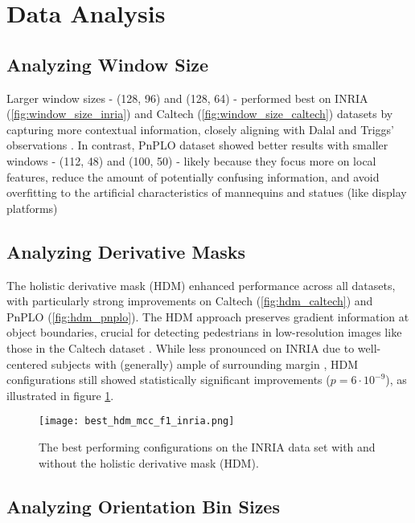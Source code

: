 \section{Data Analysis}
\subsection{Analyzing Window Size}

Larger window sizes - (128, 96) and (128, 64) - performed best on INRIA (\ref{fig:window_size_inria}) and Caltech (\ref{fig:window_size_caltech}) datasets by capturing more contextual information, closely aligning with Dalal and Triggs' observations \cite{dalal_2005_histograms}. In contrast, PnPLO dataset showed better results with smaller windows - (112, 48) and (100, 50) - likely because they focus more on local features, reduce the amount of potentially confusing information, and avoid overfitting to the artificial characteristics of mannequins and statues (like display platforms)

\subsection{Analyzing Derivative Masks}

The holistic derivative mask (HDM) enhanced performance across all datasets, with particularly strong improvements on Caltech (\ref{fig:hdm_caltech}) and PnPLO (\ref{fig:hdm_pnplo}). The HDM approach preserves gradient information at object boundaries, crucial for detecting pedestrians in low-resolution images like those in the Caltech dataset \cite{dollar_2009_pedestrian}. While less pronounced on INRIA due to well-centered subjects with (generally) ample of surrounding margin \cite{dalal_2005_histograms}, HDM configurations still showed statistically significant improvements ($p=6\cdot 10^{-9}$), as illustrated in figure \ref{fig:best_hdm_inria}.


\begin{figure}
    \texttt{[image: best\_hdm\_mcc\_f1\_inria.png]}
    \caption{
        The best performing configurations on the INRIA data set with and without the holistic derivative mask (HDM). 
    }
    \label{fig:best_hdm_inria}
\end{figure}


\subsection{Analyzing Orientation Bin Sizes}


